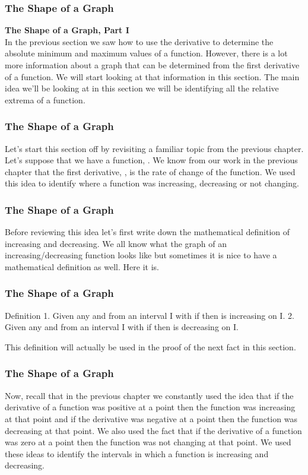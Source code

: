 \documentclass{beamer}
\begin{document}
\begin{frame} 
	\frametitle{The Shape of a Graph}
\textbf{The Shape of a Graph, Part I}\\
In the previous section we saw how to use the derivative to determine the absolute minimum and maximum values of a function.  However, there is a lot more information about a graph that can be determined from the first derivative of a function.  We will start looking at that information in this section.  The main idea we’ll be looking at in this section we will be identifying all the relative extrema of a function. 
\end{frame}
\begin{frame} 
	\frametitle{The Shape of a Graph}
Let’s start this section off by revisiting a familiar topic from the previous chapter.  Let’s suppose that we have a function, .  We know from our work in the previous chapter that the first derivative, , is the rate of change of the function.  We used this idea to identify where a function was increasing, decreasing or not changing. 
\end{frame}
\begin{frame} 
	\frametitle{The Shape of a Graph}
Before reviewing this idea let’s first write down the mathematical definition of increasing and decreasing.  We all know what the graph of an increasing/decreasing function looks like but sometimes it is nice to have a mathematical definition as well.  Here it is.
\end{frame}
\begin{frame} 
	\frametitle{The Shape of a Graph}
Definition
1.      Given any  and  from an interval  I with  if   then  is increasing on I.
2.      Given any  and  from an interval  I with  if   then  is decreasing on I.

This definition will actually be used in the proof of the next fact in this section.
\end{frame}
\begin{frame} 
	\frametitle{The Shape of a Graph}
Now, recall that in the previous chapter we constantly used the idea that if the derivative of a function was positive at a point then the function was increasing at that point and if the derivative was negative at a point then the function was decreasing at that point.  We also used the fact that if the derivative of a function was zero at a point then the function was not changing at that point.  We used these ideas to identify the intervals in which a function is increasing and decreasing.
\end{frame}
\end{document}
